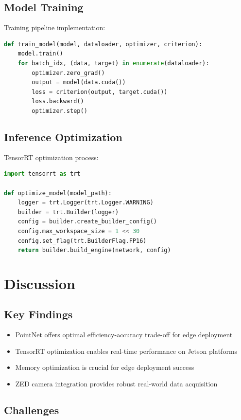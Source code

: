 \documentclass[12pt,a4paper]{report}
\begin{document}
\section{Model Training}

Training pipeline implementation:
\begin{lstlisting}[language=Python]
def train_model(model, dataloader, optimizer, criterion):
    model.train()
    for batch_idx, (data, target) in enumerate(dataloader):
        optimizer.zero_grad()
        output = model(data.cuda())
        loss = criterion(output, target.cuda())
        loss.backward()
        optimizer.step()
\end{lstlisting}

\section{Inference Optimization}

TensorRT optimization process:
\begin{lstlisting}[language=Python]
import tensorrt as trt

def optimize_model(model_path):
    logger = trt.Logger(trt.Logger.WARNING)
    builder = trt.Builder(logger)
    config = builder.create_builder_config()
    config.max_workspace_size = 1 << 30
    config.set_flag(trt.BuilderFlag.FP16)
    return builder.build_engine(network, config)
\end{lstlisting}

\chapter{Discussion}

\section{Key Findings}

\begin{itemize}
    \item PointNet offers optimal efficiency-accuracy trade-off for edge deployment
    \item TensorRT optimization enables real-time performance on Jetson platforms
    \item Memory optimization is crucial for edge deployment success
    \item ZED camera integration provides robust real-world data acquisition
\end{itemize}

\section{Challenges}
\end{document}

